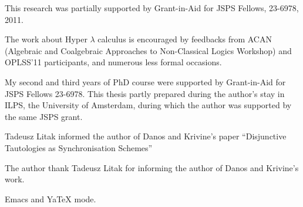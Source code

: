 \begin{acknowledge}
 This research was partially supported by
 Grant-in-Aid for JSPS Fellows, 23-6978, 2011.

 The work about Hyper $\lambda$ calculus is encouraged by feedbacks from
 ACAN (Algebraic and
 Coalgebraic
 Approaches to
 Non-Classical Logics Workshop) and OPLSS'11 participants,
 and numerous less formal occasions.

 My second and third years of PhD course were
 supported by Grant-in-Aid for JSPS Fellows 23-6978.
 This thesis partly prepared during the author's stay in
 ILPS, the University of Amsterdam, during which the author was supported
 by the same JSPS grant.

 Tadeusz Litak informed the author of Danos and Krivine's paper
 ``Disjunctive Tautologies as Synchronisation Schemes''

 The author thank Tadeusz Litak for informing the author of
 Danos and Krivine's work.

 Emacs and YaTeX mode.
\end{acknowledge}
